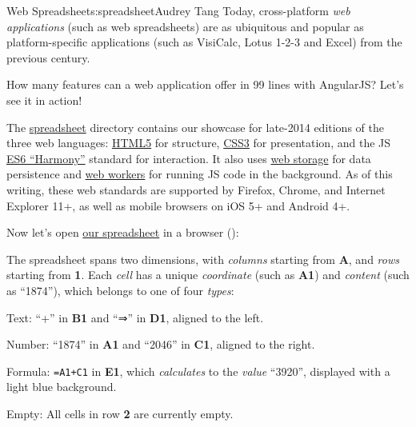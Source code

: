 \begin{aosachapter}{Web Spreadsheet}{s:spreadsheet}{Audrey Tang}
Today, cross-platform \emph{web applications} (such as web spreadsheets)
are as ubiquitous and popular as platform-specific applications (such as
VisiCalc, Lotus 1-2-3 and Excel) from the previous century.

How many features can a web application offer in 99 lines with
AngularJS? Let's see it in action!

\label{overview}

The
\href{https://github.com/audreyt/500lines/tree/master/spreadsheet/code}{spreadsheet}
directory contains our showcase for late-2014 editions of the three web
languages: \href{http://www.w3.org/TR/html5/}{HTML5} for structure,
\href{http://www.w3.org/TR/css3-ui/}{CSS3} for presentation, and the JS
\href{http://git.io/es6features}{ES6 ``Harmony''} standard for
interaction. It also uses
\href{http://www.whatwg.org/specs/web-apps/current-work/multipage/webstorage.html}{web
storage} for data persistence and
\href{http://www.whatwg.org/specs/web-apps/current-work/multipage/workers.html}{web
workers} for running JS code in the background. As of this writing,
these web standards are supported by Firefox, Chrome, and Internet
Explorer 11+, as well as mobile browsers on iOS 5+ and Android 4+.

Now let's open \href{http://audreyt.github.io/500lines/spreadsheet/}{our
spreadsheet} in a browser ():


\label{basic-concepts}

The spreadsheet spans two dimensions, with \emph{columns} starting from
\textbf{A}, and \emph{rows} starting from \textbf{1}. Each \emph{cell}
has a unique \emph{coordinate} (such as \textbf{A1}) and \emph{content}
(such as ``1874''), which belongs to one of four \emph{types}:

\begin{aosaitemize}

\item
  Text: ``+'' in \textbf{B1} and ``⇒'' in \textbf{D1}, aligned to the
  left.
\item
  Number: ``1874'' in \textbf{A1} and ``2046'' in \textbf{C1}, aligned
  to the right.
\item
  Formula: \texttt{=A1+C1} in \textbf{E1}, which \emph{calculates} to
  the \emph{value} ``3920'', displayed with a light blue background.
\item
  Empty: All cells in row \textbf{2} are currently empty.
\end{aosaitemize}


\end{aosachapter}
